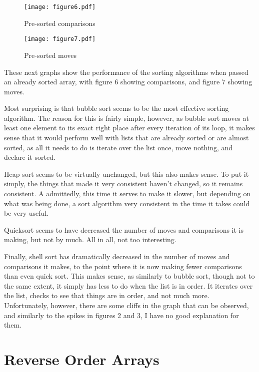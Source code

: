 \documentclass[11pt]{article}
\begin{document}
\begin{figure}[tbp]
\begin{centering}
\texttt{[image: figure6.pdf]}
\caption{Pre-sorted comparisons}
\end{centering}
\end{figure}

\begin{figure}[tbp]
\begin{centering}
\texttt{[image: figure7.pdf]}
\caption{Pre-sorted moves}
\end{centering}
\end{figure}

These next graphs show the performance of the sorting algorithms when passed an already sorted array, with figure 6 showing comparisons, and figure 7 showing moves.

Most surprising is that bubble sort seems to be the most effective sorting algorithm. The reason for this is fairly simple, however, as bubble sort moves at least one element to its exact right place after every iteration of its loop, it makes sense that it would perform well with lists that are already sorted or are almost sorted, as all it needs to do is iterate over the list once, move nothing, and declare it sorted.

Heap sort seems to be virtually unchanged, but this also makes sense. To put it simply, the things that made it very consistent haven't changed, so it remains consistent. A
admittedly, this time it serves to make it slower, but depending on what was being done, a sort algorithm very consistent in the time it takes could be very useful.

Quicksort seems to have decreased the number of moves and comparisons it is making, but not by much. All in all, not too interesting.

Finally, shell sort has dramatically decreased in the number of moves and comparisons it makes, to the point where it is now making fewer comparisons than even quick sort. This makes sense, as similarly to bubble sort, though not to the same extent, it simply has less to do when the list is in order. It iterates over the list, checks to see that things are in order, and not much more. Unfortunately, however, there are some cliffs in the graph that can be observed, and similarly to the spikes in figures 2 and 3, I have no good explanation for them.

\section{Reverse Order Arrays}
\end{document}
